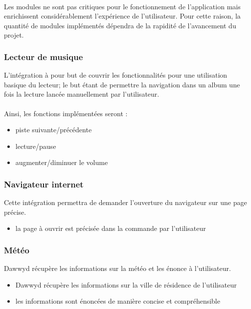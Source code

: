 \documentclass[12pt]{article}
\begin{document}
\begin{description}
    \paragraph{}
    Les modules ne sont pas critiques pour le fonctionnement de l'application
    mais enrichissent considérablement l'expérience de l'utilisateur. Pour
    cette raison, la quantité de modules implémentés dépendra de la rapidité
    de l'avancement du projet.

    \subsubsection{Lecteur de musique}
    L'intégration à pour but de couvrir les fonctionnalités pour une utilisation
    basique du lecteur; le but étant de permettre la navigation dans un album
    une fois la lecture lancée manuellement par l'utilisateur.
    
    \paragraph{}
    Ainsi, les fonctions implémentées seront :
    \begin{itemize}
        \item piste suivante/précédente
        \item lecture/pause
        \item augmenter/diminuer le volume
    \end{itemize}
    
    \subsubsection{Navigateur internet}
    Cette intégration permettra de demander l'ouverture du navigateur sur une page
    précise.

    \begin{itemize}
        \item la page à ouvrir est précisée dans la commande par l'utilisateur
    \end{itemize}

    \subsubsection{Météo}
    Dawwyd récupère les informations sur la météo et les énonce à l'utilisateur.

    \begin{itemize}
        \item Dawwyd récupère les informations sur la ville de résidence de l'utilisateur
        \item les informations sont énoncées de manière concise et compréhensible
    \end{itemize}


\end{description}
\end{document}
